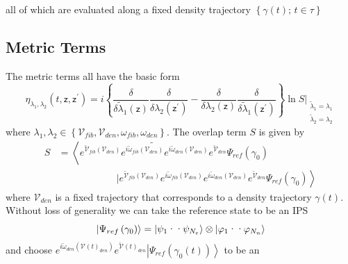 \documentclass[aps,preprint]{revtex4}%
\begin{document}
all of which are evaluated along a fixed density trajectory $\left\{
\gamma\left(  t\right)  ;\,t\in\tau\right\}  $

\subsection{\bigskip Metric Terms}

The metric terms all have the basic form
\begin{equation}
\eta_{\lambda_{1},\lambda_{2}}(t,\mathsf{z},\mathsf{z}^{\prime})=i\left\{
\frac{\delta}{\delta\tilde{\lambda}_{1}(\mathsf{z})}\frac{\delta}%
{\delta\lambda_{2}(\mathsf{z}^{\prime})}-\frac{\delta}{\delta\lambda
_{2}(\mathsf{z})}\frac{\delta}{\delta\tilde{\lambda}_{1}(\mathsf{z}^{\prime}%
)}\right\}  \ln S| _{\substack{\tilde{\lambda}_{1}=\lambda_{1} \\\tilde
{\lambda}_{2}=\lambda_{2} }} \label{metric}%
\end{equation}
where $\lambda_{1},\lambda_{2}\in\left\{  \mathcal{V}_{fib},\mathcal{V}%
_{den},\omega_{fib},\omega_{den}\right\}  $. The overlap term $S$ is given by
\begin{align}
S  &  =\left\langle \widetilde{e^{\mathcal{\breve{V}}_{fib}(\mathcal{V}%
_{den})}e^{i\mathcal{\breve{\omega}}_{fib}(\mathcal{V}_{den})}%
e^{i\mathcal{\breve{\omega}}_{den}(\mathcal{V}_{den})}e^{\mathcal{\breve{V}%
}_{den}}}\Psi_{ref}\left(  \gamma_{0}\right)  \right. \nonumber\\
&  \qquad\qquad\qquad\left.  |e^{\mathcal{\breve{V}}_{fib}(\mathcal{V}_{den}%
)}e^{i\mathcal{\breve{\omega}}_{fib}(\mathcal{V}_{den})}e^{i\mathcal{\breve
{\omega}}_{den}(\mathcal{V}_{den})}e^{\mathcal{\breve{V}}_{den}}\Psi
_{ref}\left(  \gamma_{0}\right)  \right\rangle
\end{align}
where $\mathcal{V}_{den}$ is a fixed trajectory that corresponds to a density
trajectory $\gamma\left(  t\right)  $. Without loss of generality we can take
the reference state to be an IPS
\begin{equation}
\left|  \Psi_{ref}\left(  \gamma_{0}\right)  \right\rangle =\left|  \psi
_{1}\text{\textperiodcentered\textperiodcentered}\psi_{N_{e}}\right\rangle
\otimes\left|  \varphi_{1}\text{\textperiodcentered\textperiodcentered}%
\varphi_{N_{n}}\right\rangle
\end{equation}
and choose $e^{i\mathcal{\breve{\omega}}_{den}(\mathcal{V}\left(  t\right)
_{den})}e^{\mathcal{\breve{V}}\left(  t\right)  _{den}}\left|  \Psi
_{ref}\left(  \gamma_{0}\left(  t\right)  \right)  \right\rangle $ to be an
\end{document}
